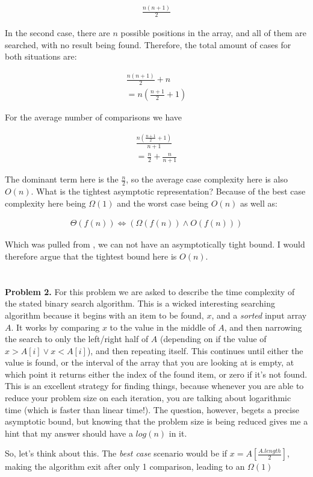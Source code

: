 \documentclass{article}
\begin{document}
\begin{gather}
    \frac{n(n+1)}{2}
\end{gather}

In the second case, there are $n$ possible positions in the array, and all of them are searched, with no result being found. Therefore, the total amount of cases for both situations are:

\begin{gather}
    \frac{n(n+1)}{2} + n \\
    = n(\frac{n+1}{2}+1)
\end{gather}

For the average number of comparisons we have 

\begin{gather}
    \frac{n(\frac{n+1}{2}+1)}{n+1} \\
    = \frac{n}{2} + \frac{n}{n+1}
\end{gather}

The dominant term here is the $\frac{n}{2}$, so the average case complexity here is also $O(n)$. What is the tightest asymptotic representation? Because of the best case complexity here being $\Omega(1)$ and the worst case being $O(n)$ as well as:

\begin{gather}
    \Theta(f(n)) \Leftrightarrow (\Omega(f(n)) \land O(f(n)))
\end{gather}

Which was pulled from \cite{website:1}, we can not have an asymptotically tight bound. I would therefore argue that the tightest bound here is $O(n)$.


\section*{}

\textbf{Problem 2.} For this problem we are asked to describe the time complexity of the stated binary search algorithm. This is a wicked interesting searching algorithm because it begins with an item to be found, $x$, and a \emph{sorted} input array $A$. It works by comparing $x$ to the value in the middle of $A$, and then narrowing the search to only the left/right half of $A$ (depending on if the value of $x > A[i] \lor x < A[i]$), and then repeating itself. This continues until either the value is found, or the interval of the array that you are looking at is empty, at which point it returns either the index of the found item, or zero if it's not found. This is an excellent strategy for finding things, because whenever you are able to reduce your problem size on each iteration, you are talking about logarithmic time (which is faster than linear time!). The question, however, begets a precise asymptotic bound, but knowing that the problem size is being reduced gives me a hint that my answer should have a $log(n)$ in it.

So, let's think about this. The \emph{best case} scenario would be if $x = A[\frac{A.length}{2}]$, making the algorithm exit after only 1 comparison, leading to an $\Omega(1)$

\newpage
 

\end{document}
